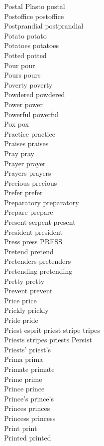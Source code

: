 Postal Plasto postal\\
Postoffice postoffice\\
Postprandial postprandial\\
Potato potato\\
Potatoes potatoes\\
Potted potted\\
Pour pour\\
Pours pours\\
Poverty poverty\\
Powdered powdered\\
Power power\\
Powerful powerful\\
Pox pox\\
Practice practice\\
Praises praises\\
Pray pray\\
Prayer prayer\\
Prayers prayers\\
Precious precious\\
Prefer prefer\\
Preparatory preparatory\\
Prepare prepare\\
Present serpent present\\
President president\\
Press press PRESS\\
Pretend pretend\\
Pretenders pretenders\\
Pretending pretending\\
Pretty pretty\\
Prevent prevent\\
Price price\\
Prickly prickly\\
Pride pride\\
Priest esprit priest stripe tripes\\
Priests stripes priests Persist\\
Priests' priest's\\
Prima prima\\
Primate primate\\
Prime prime\\
Prince prince\\
Prince's prince's\\
Princes princes\\
Princess princess\\
Print print\\
Printed printed\\
